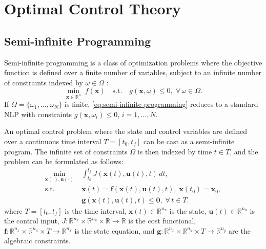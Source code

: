 


\section{Optimal Control Theory}
\subsection{Semi-infinite Programming}\label{sec:semi-infinite-programming}

Semi-infinite programming is a class of optimization problems where the objective function is defined over a finite number of variables, subject to an infinite number of constraints  indexed by $\omega\in\Omega$ \citep{Bonnans2013-gt}:
\begin{equation}\label{eq:semi-infinite-programming}
  \min_{\mathbf x\in\mathbb R^n}\; f(\mathbf x)
  \quad\text{s.t.}\quad g(\mathbf x,\omega)\le0,\;\forall\,\omega\in\Omega.
\end{equation}
If $\Omega=\{\omega_1,\dots,\omega_N\}$ is finite, \eqref{eq:semi-infinite-programming} reduces to a standard \acrfull{NLP} with constraints $g(\mathbf x,\omega_i)\le0$, $i=1,\dots,N$.

An optimal control problem where the state and control variables are defined over a continuous time interval $T=[t_0,t_f]$ can be cast as a semi-infinite program.  The infinite set of constraints $\Omega$ is then indexed by time $t\in T$, and the problem can be formulated as follows:
\begin{equation}\label{eq:optimal-control-problem}
  \begin{aligned}
    \min_{\mathbf{x}(\cdot),\mathbf{u}(\cdot)}\;&\int_{t_0}^{t_f}J(\mathbf x(t),\mathbf u(t),t)\,dt,\\
    \text{s.t.}\;&\dot{\mathbf x}(t)=\mathbf f(\mathbf x(t),\mathbf u(t),t),\;\mathbf x(t_0)=\mathbf x_0,\\
                &\mathbf g(\mathbf x(t),\mathbf u(t),t)\le\mathbf 0,\;\forall\,t\in T.
  \end{aligned}
\end{equation}
where $T = [t_0, t_f]$ is the time interval, $\mathbf{x}(t) \in \mathbb R^{n_x}$ is the state, $\mathbf{u}(t) \in \mathbb R^{n_u}$ is the control input, $J : \mathbb R^{n_x} \times \mathbb R^{n_u} \times \mathbb R \to \mathbb R$ is the cost functional, $\mathbf f : \mathbb R^{n_x} \times \mathbb R^{n_u} \times T \to \mathbb R^{n_x}$ is the state equation, and $\mathbf g : \mathbb R^{n_x} \times \mathbb R^{n_u} \times T \to \mathbb R^{n_g}$ are the algebraic constraints. 


